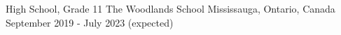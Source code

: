 

\begin{cventries}

  \cventry
    {High School, Grade 11} %
    {The Woodlands School} %
    {Mississauga, Ontario, Canada} %
    {September 2019 - July 2023 (expected)} %

\end{cventries}
